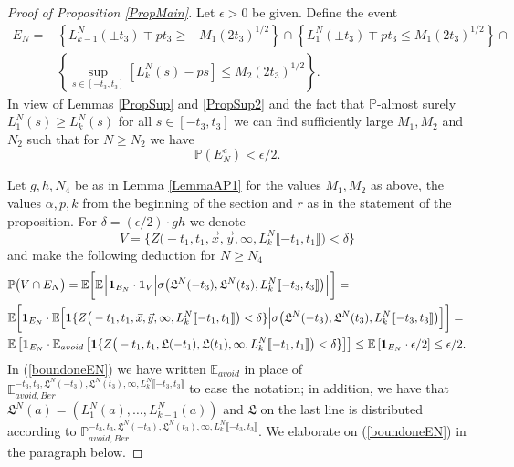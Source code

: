 \begin{proof}[Proof of Proposition \ref{PropMain}] Let $\epsilon > 0$ be given. Define the event
	\begin{equation*}
	\begin{split}
	E_N = &\left\{    L_{k-1}^N(  \pm t_3) \mp pt_3 \geq  - M_1 (2t_3)^{1/2}\right\} \cap \left\{    L_{1}^N(  \pm t_3) \mp pt_3 \leq   M_1 (2t_3)^{1/2}\right\} \cap \\
	& \left\{ \sup_{s \in [ -t_3, t_3]} [{L}^N_{k}(s) - p s ]\leq M_2  (2t_3)^{1/2} \right\}.
	\end{split}
	\end{equation*}
	In view of  Lemmas \ref{PropSup} and \ref{PropSup2} and the fact that $\mathbb{P}$-almost surely $L_1^N(s) \geq L_k^N(s)$ for all $s \in [ -t_3, t_3]$ we can find sufficiently large $M_1, M_2$ and $N_2$ such that for $N \geq N_2$ we have 
	\begin{equation}\label{UBEC}
	\mathbb{P}(E_N^c) <  \epsilon / 2.
	\end{equation}
	
	
	Let $g,h, N_4$ be as in Lemma \ref{LemmaAP1} for the values $M_1, M_2$ as above, the values $\alpha, p, k$ from the beginning of the section and $r$ as in the statement of the proposition. For $\delta = (\epsilon/2) \cdot g h$ we denote
	$$V = \Big\{Z\big( -t_1,t_1, \vec{x}, \vec{y} , \infty,  L^N_{k}\llbracket -t_1, t_1\rrbracket\big)< \delta\Big\}$$
	and make the following deduction for $N \geq N_4$
	\begin{equation}\label{boundoneEN}
	\begin{split}
	&\mathbb{P}\big( V \cap E_N \big) =\mathbb{E} \bigg[    \mathbb{E}\Big[{\bf 1}_{E_N} \cdot {\bf 1}_{V} \Big{|} \sigma \big( \mathfrak{L}^N(-t_3),  \mathfrak{L}^N(t_3),L^N_k\llbracket -t_3, t_3\rrbracket   \big)\Big] \bigg] = \\
	&\mathbb{E} \bigg[ {\bf 1}_{E_N} \cdot   \mathbb{E}\Big[ {\bf 1} \{ Z\big( -t_1,t_1, \vec{x}, \vec{y} , \infty,  L^N_{k}\llbracket -t_1, t_1\rrbracket \big) < \delta\}   \Big{|} \sigma \big( \mathfrak{L}^N(-t_3),  \mathfrak{L}^N(t_3),L^N_k\llbracket -t_3, t_3\rrbracket   \big) \Big] \bigg]  = \\
	&\mathbb{E} \left[ {\bf 1}_{E_N} \cdot  \mathbb{E}_{avoid}\left[ {\bf 1} \{ Z\big( -t_1, t_1, \mathfrak{L}(-t_1),\mathfrak{L}(t_1), \infty, {L}^N_k\llbracket -t_1, t_1\rrbracket \big) < \delta\} \right] \right] \leq  \mathbb{E} \left[ {\bf 1}_{E_N} \cdot  \epsilon/2 \right] \leq \epsilon/2.
	\end{split}
	\end{equation}
	In (\ref{boundoneEN}) we have written $\mathbb{E}_{avoid}$ in place of $\mathbb{E}^{-t_3, t_3, \mathfrak{L}^N(-t_3), \mathfrak{L}^N(t_3), \infty, L^N_k\llbracket -t_3, t_3\rrbracket }_{avoid, Ber}$ to ease the notation; in addition, we have that $\mathfrak{L}^N(a) = (L_1^N(a), \dots, L_{k-1}^N(a))$ and $\mathfrak{L}$ on the last line is distributed according to $\mathbb{P}^{-t_3, t_3, \mathfrak{L}^N(-t_3), \mathfrak{L}^N(t_3), \infty, L^N_k\llbracket -t_3, t_3\rrbracket }_{avoid, Ber}$. We elaborate on (\ref{boundoneEN}) in the paragraph below.
	

\end{proof}
